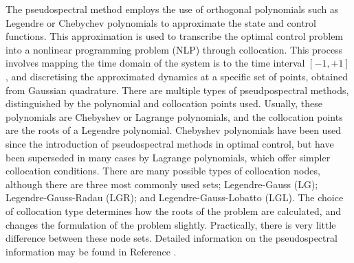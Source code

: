 The pseudospectral method employs the use of orthogonal polynomials such as Legendre or Chebychev polynomials to approximate the state and control functions.
This approximation is used to transcribe the optimal control problem into a nonlinear programming problem (NLP) through collocation. This process involves mapping the time domain of the system is to the time interval $[-1,+1]$, and discretising the approximated dynamics at a specific set of points, obtained from Gaussian quadrature\cite{Fahroo2000,Huntington2007,Kelly2015,Rao2009,Garg2011}. 
There are multiple types of pseudpospectral methods, distinguished by the polynomial and collocation points used. Usually, these polynomials are Chebyshev or Lagrange polynomials\cite{Fahroo2000,Rao2009}, and the collocation points are the roots of a Legendre polynomial\cite{Garg2009}. Chebyshev polynomials have been used since the introduction of pseudospectral methods in optimal control, but have been superseded in many cases by Lagrange polynomials, which offer simpler collocation conditions\cite{Rao2009}. 
There are many possible types of collocation nodes, although there are three most commonly used sets; Legendre-Gauss (LG); Legendre-Gauss-Radau (LGR); and Legendre-Gauss-Lobatto (LGL)\cite{Garg2009,Rao2009}. The choice of collocation type determines how the roots of the problem are calculated, and changes the formulation of the problem slightly\cite{Garg2009}. Practically, there is very little difference between these node sets\cite{Garg2009}.
Detailed information on the pseudospectral information may be found in Reference \cite{Huntington2007}.


